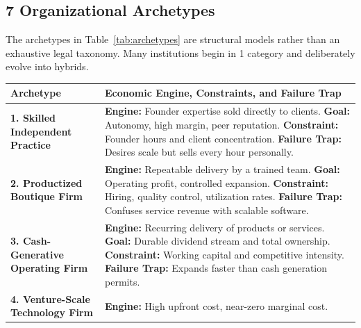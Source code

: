 \subsection{7 Organizational Archetypes}

The archetypes in Table~\ref{tab:archetypes} are structural models rather than an exhaustive legal taxonomy. Many institutions begin in 1 category and deliberately evolve into hybrids.

\begin{table}[htbp]
\centering
\begin{tcolorbox}[
  enhanced,
  colback=white,
  colframe=BayesBorder!80!white,
  boxrule=0.4pt,
  arc=2pt,
  left=3pt,right=3pt,top=3pt,bottom=3pt,
  before skip=3pt,after skip=4pt
]
\scriptsize
\setlength{\tabcolsep}{3pt}
\renewcommand{\arraystretch}{1.2}
\begin{tabularx}{\linewidth}{@{} >{\bfseries\color{BayesInk}}p{2.3cm} >{\color{BayesInk}}X @{}}
\toprule
\textbf{Archetype} & \textbf{Economic Engine, Constraints, and Failure Trap} \\
\midrule
1. Skilled Independent Practice & 
\textbf{Engine:} Founder expertise sold directly to clients.\newline
\textbf{Goal:} Autonomy, high margin, peer reputation.\newline
\textbf{Constraint:} Founder hours and client concentration.\newline
\textbf{Failure Trap:} Desires scale but sells every hour personally. \\
\midrule
2. Productized Boutique Firm & 
\textbf{Engine:} Repeatable delivery by a trained team.\newline
\textbf{Goal:} Operating profit, controlled expansion.\newline
\textbf{Constraint:} Hiring, quality control, utilization rates.\newline
\textbf{Failure Trap:} Confuses service revenue with scalable software. \\
\midrule
3. Cash-Generative Operating Firm & 
\textbf{Engine:} Recurring delivery of products or services.\newline
\textbf{Goal:} Durable dividend stream and total ownership.\newline
\textbf{Constraint:} Working capital and competitive intensity.\newline
\textbf{Failure Trap:} Expands faster than cash generation permits. \\
\midrule
4. Venture-Scale Technology Firm & 
\textbf{Engine:} High upfront cost, near-zero marginal cost.\newline

\end{tabularx}
\end{tcolorbox}
\end{table}
